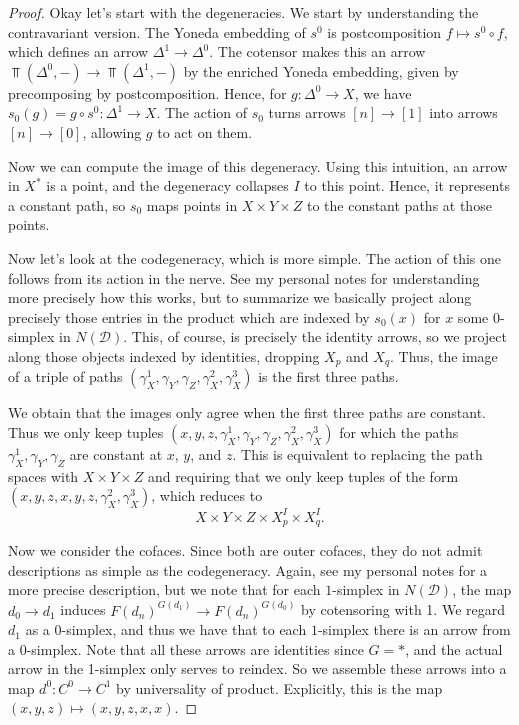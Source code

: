 \begin{proof}
Okay let's start with the degeneracies. We start by understanding the contravariant version. The Yoneda embedding of $s^0$ is postcomposition $f\mapsto s^0\circ f$, which defines an arrow $\Delta^1\to\Delta^0$. The cotensor makes this an arrow $\Top (\Delta^0,-)\to\Top(\Delta^1,-)$ by the enriched Yoneda embedding, given by precomposing by postcomposition. Hence, for $g : \Delta^0 \to X$, we have $s_0(g)=g\circ s^0 : \Delta^1 \to X$. The action of $s_0$ turns arrows $[n]\to [1]$ into arrows $[n]\to [0]$, allowing $g$ to act on them.

Now we can compute the image of this degeneracy. Using this intuition, an arrow in $X^*$ is a point, and the degeneracy collapses $I$ to this point. Hence, it represents a constant path, so $s_0$ maps points in $X\times Y\times Z$ to the constant paths at those points.

Now let's look at the codegeneracy, which is more simple. The action of this one follows from its action in the nerve. See my personal notes for understanding more precisely how this works, but to summarize we basically project along precisely those entries in the product which are indexed by $s_0(x)$ for $x$ some 0-simplex in $N(\mathcal{D} )$. This, of course, is precisely the identity arrows, so we project along those objects indexed by identities, dropping $X_p$ and $X_q$. Thus, the image of a triple of paths $(\gamma_X^1,\gamma_Y,\gamma_Z,\gamma_X^2,\gamma_X^3)$ is the first three paths.

We obtain that the images only agree when the first three paths are constant. Thus we only keep tuples $(x,y,z,\gamma_X^1,\gamma_Y,\gamma_Z,\gamma_X^2,\gamma_X^3)$ for which the paths $\gamma_X^1,\gamma_Y,\gamma_Z$ are constant at $x$, $y$, and $z$. This is equivalent to replacing the path spaces with $X\times Y\times Z$ and requiring that we only keep tuples of the form $(x,y,z,x,y,z,\gamma_X^2,\gamma_X^3)$, which reduces to
\[
	X\times Y\times Z\times X_p^I\times X_q^I
.\]

Now we consider the cofaces. Since both are outer cofaces, they do not admit descriptions as simple as the codegeneracy. Again, see my personal notes for a more precise description, but we note that for each $1$-simplex in $N(\mathcal{D} )$, the map $d_0\to d_1$ induces $F(d_n)^{G(d_1)} \to F(d_n)^{G(d_0)} $ by cotensoring with 1. We regard $d_1$ as a 0-simplex, and thus we have that to each $1$-simplex there is an arrow from a 0-simplex. Note that all these arrows are identities since $G=*$, and the actual arrow in the 1-simplex only serves to reindex. So we assemble these arrows into a map $d^0 : C^0 \to C^1$ by universality of product. Explicitly, this is the map $(x,y,z)\mapsto (x,y,z,x,x)$.


\end{proof}
